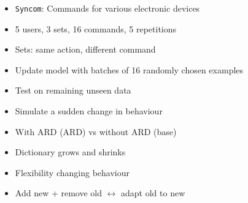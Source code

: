 \documentclass[a0,sans]{esatposter}
\begin{document}
{{	}\vbs
	{
		\vspace{-2cm}
		\Large{
			\begin{itemize}
				\item \texttt{Syncom}: Commands for various electronic devices
				\item 5 users, 3 sets, 16 commands, 5 repetitions
				\item Sets: same action, different command
				\item Update model with batches of 16 randomly chosen examples
				\item Test on remaining unseen data
				\item Simulate a sudden change in behaviour
				\item With ARD (ARD) vs without ARD (base)
			\end{itemize}
		}
	}\vbs
	{
		\vspace{-2cm}
		\Large{\begin{itemize}
			\item Dictionary grows and shrinks
			\item Flexibility changing behaviour
			\item Add new + remove old $\leftrightarrow$ adapt old to new
		\end{itemize}}
	}
}\hbs
{}
\end{document}
